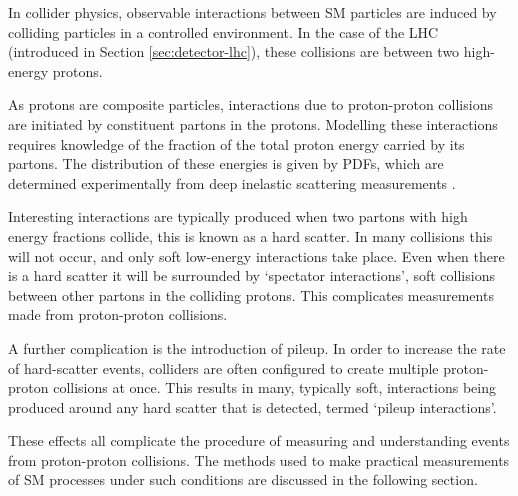 
In collider physics, observable interactions between \ac{SM} particles are
induced by colliding particles in a controlled environment. In the case of the
\acs{LHC} (introduced in Section \ref{sec:detector-lhc}), these collisions are
between two high-energy protons.

As protons are composite particles, interactions due to proton-proton collisions
are initiated by constituent partons in the protons. Modelling these
interactions requires knowledge of the fraction of the total proton energy
carried by its partons. The distribution of these energies is given by
\acp{PDF}, which are determined experimentally from deep inelastic scattering
measurements \cite{NNPDF3dot1}.

Interesting interactions are typically produced when two partons with high
energy fractions collide, this is known as a hard scatter. In many collisions
this will not occur, and only soft low-energy interactions take place. Even when
there is a hard scatter it will be surrounded by `spectator interactions', soft
collisions between other partons in the colliding protons. This complicates
measurements made from proton-proton collisions.

A further complication is the introduction of pileup. In order to increase the
rate of hard-scatter events, colliders are often configured to create multiple
proton-proton collisions at once. This results in many, typically soft,
interactions being produced around any hard scatter that is detected, termed
`pileup interactions'.

These effects all complicate the procedure of measuring and understanding events
from proton-proton collisions. The methods used to make practical measurements
of \ac{SM} processes under such conditions are discussed in the following
section.
